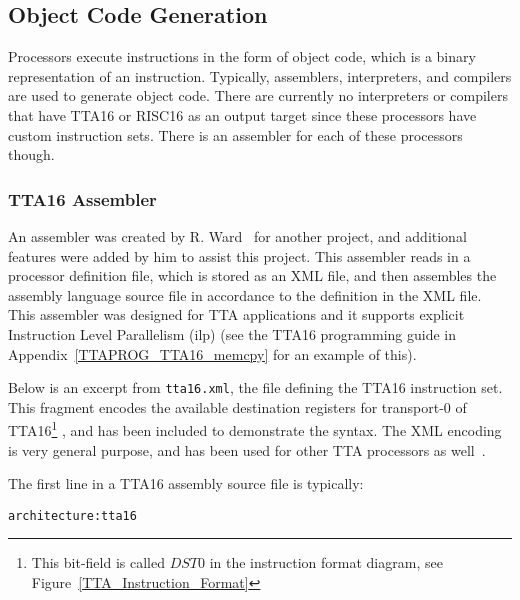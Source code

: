 \subsection{Object Code Generation}
Processors execute instructions in the form of object code, which is a binary
representation of an instruction. Typically, assemblers, interpreters, and
compilers are used to generate object code. There are currently no interpreters
or compilers that have TTA16 or RISC16 as an output target since these processors
have custom instruction sets. There is an assembler for each of these processors
though.

\subsubsection{TTA16 Assembler}

An assembler was created by R. Ward~\cite{XML_Assembler} for another project, and
additional features were added by him to assist this project. This assembler
reads in a processor definition file, which is stored as an XML file, and then
assembles the assembly language source file in accordance to the definition in
the XML file. This assembler was designed for TTA applications and it supports
explicit Instruction Level Parallelism (\gls{ilp}) (see the TTA16 programming
guide in Appendix~\ref{TTAPROG_TTA16_memcpy} for an example of this).

Below is an excerpt from \texttt{tta16.xml}, the file defining the TTA16
instruction set. This fragment encodes the available destination registers for
transport-0 of TTA16\footnote{This bit-field is called $DST0$ in the instruction
format diagram, see Figure~\ref{TTA_Instruction_Format}} , and has been included
to demonstrate the syntax. The XML encoding is very general purpose, and has been
used for other TTA processors as well~\cite{TTA_Ray_Trace}.

\begin{center}
\begin{minipage}{0.8\linewidth}
\footnotesize

\normalsize
\end{minipage}
\end{center}

\noindent The first line in a TTA16 assembly source file is typically:
\begin{center}
\begin{minipage}{0.5\linewidth}
\begin{verbatim}
architecture:tta16
\end{verbatim}
\end{minipage}
\end{center}

